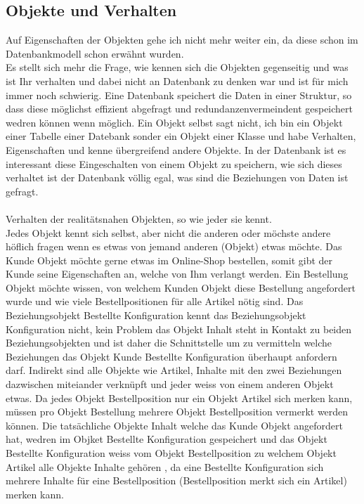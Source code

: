\documentclass{article}
\begin{document}
\subsection{Objekte und Verhalten}
Auf Eigenschaften der Objekten gehe ich nicht mehr weiter ein, da diese schon im Datenbankmodell schon erwähnt wurden.\\
Es stellt sich mehr die Frage, wie kennen sich die Objekten gegenseitig und was ist Ihr verhalten und dabei nicht an Datenbank zu denken war und ist für mich immer noch schwierig.
Eine Datenbank speichert die Daten in einer Struktur, so dass diese möglichst effizient abgefragt und redundanzenvermeindent gespeichert wedren können wenn möglich.
Ein Objekt selbst sagt nicht, ich bin ein Objekt einer Tabelle einer Datebank sonder ein Objekt einer Klasse und habe Verhalten, Eigenschaften und kenne übergreifend andere Objekte.
In der Datenbank ist es interessant diese Eingeschalten von einem Objekt zu speichern, wie sich dieses verhaltet ist der Datenbank völlig egal, was sind die Beziehungen von Daten ist gefragt.\\
\\
Verhalten der realitätsnahen Objekten, so wie jeder sie kennt.\\
Jedes Objekt kennt sich selbst, aber nicht die anderen oder möchste andere höflich fragen wenn es etwas von jemand anderen (Objekt) etwas möchte.
Das Kunde Objekt möchte gerne etwas im Online-Shop bestellen, somit gibt der Kunde seine Eigenschaften an, welche von Ihm verlangt werden.
Ein Bestellung Objekt möchte wissen, von welchem Kunden Objekt diese Bestellung angefordert wurde und wie viele Bestellpositionen für alle Artikel nötig sind.
Das Beziehungsobjekt Bestellte Konfiguration kennt das Beziehungsobjekt Konfiguration nicht, kein Problem das Objekt Inhalt steht in Kontakt zu beiden Beziehungsobjekten
und ist daher die Schnittstelle um zu vermitteln welche Beziehungen das Objekt Kunde Bestellte Konfiguration überhaupt anfordern darf.
Indirekt sind alle Objekte wie Artikel, Inhalte mit den zwei Beziehungen dazwischen miteiander verknüpft und jeder weiss von einem anderen Objekt etwas.
Da jedes Objekt Bestellposition nur ein Objekt Artikel sich merken kann, müssen pro Objekt Bestellung mehrere Objekt Bestellposition vermerkt werden können.
Die tatsächliche Objekte Inhalt welche das Kunde Objekt angefordert hat, wedren im Objket Bestellte Konfiguration gespeichert und das Objekt Bestellte Konfiguration weiss vom Objekt Bestellposition zu welchem Objekt Artikel alle Objekte Inhalte gehören
, da eine Bestellte Konfiguration sich mehrere Inhalte für eine Bestellposition (Bestellposition merkt sich ein Artikel) merken kann.\\
\end{document}
